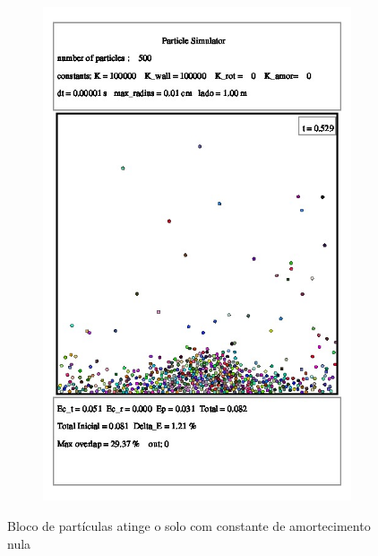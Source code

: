 \documentclass[a4paper,11pt]{article}
\begin{document}
\begin{figure}[!hto]
\begin{subfigure}{0.5\textwidth}
		\includegraphics[scale=0.4]{./images/time_3.jpeg}
		\caption{}
	\end{subfigure}
	\caption{Bloco de partículas atinge o solo com constante de amortecimento nula}
	\label{fig:simulation}
\end{figure}
\FloatBarrier
\end{document}
